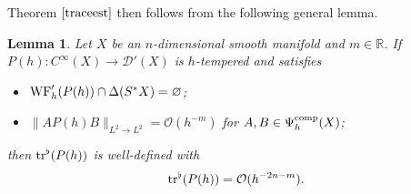 \documentclass[reqno,12pt,letterpaper]{amsart}
\newtheorem{lem}[prop]{Lemma}
\numberwithin{equation}{section}
\numberwithin{prop}{section}
\begin{document}
Theorem $\ref{traceest}$ then follows from the following general lemma.
\begin{lem}\label{traceest_lem}
Let $X$ be an $n$-dimensional smooth manifold and $m\in \mathbb{R}$. If $P(h):C^\infty(X)\to \mathcal{D}'(X)$ is $h$-tempered and satisfies
\begin{itemize}
    \item ${\rm WF}_h'(P(h))\cap \Delta(S^*X)=\varnothing$;
    \item $\|AP(h)B\|_{L^2\to L^2}=\mathcal{O}(h^{-m})$ for $A,B\in \Psi^{\rm comp}_h(X)$;
\end{itemize}
then ${\rm tr}^\flat (P(h))$ is well-defined with
\begin{align*}
    {\rm tr}^\flat (P(h))=\mathcal{O}(h^{-2n-m}).
\end{align*}
\end{lem}
\end{document}
